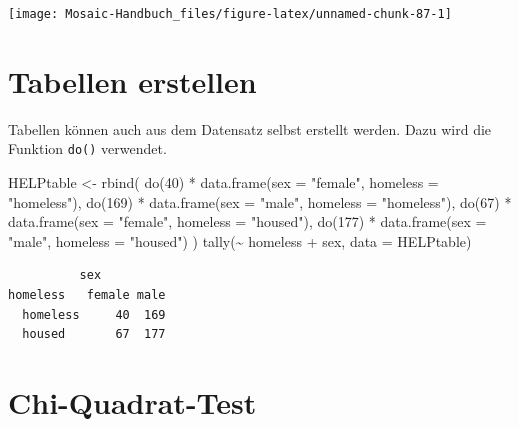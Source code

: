 \documentclass[
  ngerman,
]{scrbook}
\newenvironment{Shaded}{\begin{snugshade}}{\end{snugshade}}
\newcommand{\AttributeTok}[1]{\textcolor[rgb]{0.77,0.63,0.00}{#1}}
\newcommand{\DecValTok}[1]{\textcolor[rgb]{0.00,0.00,0.81}{#1}}
\newcommand{\FunctionTok}[1]{\textcolor[rgb]{0.00,0.00,0.00}{#1}}
\newcommand{\NormalTok}[1]{#1}
\newcommand{\OtherTok}[1]{\textcolor[rgb]{0.56,0.35,0.01}{#1}}
\newcommand{\SpecialCharTok}[1]{\textcolor[rgb]{0.00,0.00,0.00}{#1}}
\newcommand{\StringTok}[1]{\textcolor[rgb]{0.31,0.60,0.02}{#1}}
\begin{document}
\begin{center}\texttt{[image: Mosaic-Handbuch\_files/figure-latex/unnamed-chunk-87-1]} \end{center}

\hypertarget{tabellen-erstellen}{%
\section{Tabellen erstellen}\label{tabellen-erstellen}}

Tabellen können auch aus dem Datensatz selbst erstellt werden. Dazu wird die Funktion \texttt{do()} verwendet.

\begin{Shaded}
\begin{Highlighting}[]
\NormalTok{HELPtable }\OtherTok{\textless{}{-}} \FunctionTok{rbind}\NormalTok{(}
  \FunctionTok{do}\NormalTok{(}\DecValTok{40}\NormalTok{)  }\SpecialCharTok{*} \FunctionTok{data.frame}\NormalTok{(}\AttributeTok{sex =} \StringTok{"female"}\NormalTok{, }\AttributeTok{homeless =} \StringTok{"homeless"}\NormalTok{),}
  \FunctionTok{do}\NormalTok{(}\DecValTok{169}\NormalTok{) }\SpecialCharTok{*} \FunctionTok{data.frame}\NormalTok{(}\AttributeTok{sex =} \StringTok{"male"}\NormalTok{, }\AttributeTok{homeless =} \StringTok{"homeless"}\NormalTok{),}
  \FunctionTok{do}\NormalTok{(}\DecValTok{67}\NormalTok{)  }\SpecialCharTok{*} \FunctionTok{data.frame}\NormalTok{(}\AttributeTok{sex =} \StringTok{"female"}\NormalTok{, }\AttributeTok{homeless =} \StringTok{"housed"}\NormalTok{),}
  \FunctionTok{do}\NormalTok{(}\DecValTok{177}\NormalTok{) }\SpecialCharTok{*} \FunctionTok{data.frame}\NormalTok{(}\AttributeTok{sex =} \StringTok{"male"}\NormalTok{, }\AttributeTok{homeless =} \StringTok{"housed"}\NormalTok{)}
\NormalTok{)}
\FunctionTok{tally}\NormalTok{(}\SpecialCharTok{\textasciitilde{}}\NormalTok{ homeless }\SpecialCharTok{+}\NormalTok{ sex, }\AttributeTok{data =}\NormalTok{ HELPtable)}
\end{Highlighting}
\end{Shaded}

\begin{verbatim}
          sex
homeless   female male
  homeless     40  169
  housed       67  177
\end{verbatim}

\hypertarget{chi-quadrat-test}{%
\section{Chi-Quadrat-Test}\label{chi-quadrat-test}}
\end{document}
